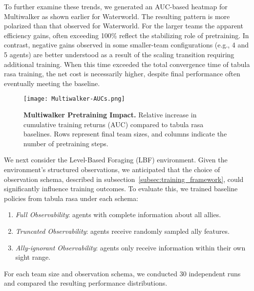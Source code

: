 \documentclass{article}
\begin{document}
To further examine these trends, we generated an AUC-based heatmap for Multiwalker as shown 
earlier for Waterworld. The resulting pattern is more polarized than that observed for Waterworld.
For the larger teams the apparent efficiency gains, often exceeding 100\%
reflect the stabilizing role of pretraining.
In contrast, negative gains observed in some smaller-team configurations (e.g., 4 and 5 agents) 
are better understood as a result of the scaling transition requiring additional training. 
When this time exceeded the total convergence time of tabula rasa training, the net cost 
is necessarily higher, despite final performance often eventually meeting the baseline.

\begin{figure}[!h]
    \centering
    \texttt{[image: Multiwalker-AUCs.png]}
    \caption{\textbf{Multiwalker Pretraining Impact.} 
    Relative increase in cumulative training returns (AUC) compared to tabula rasa baselines. 
    Rows represent final team sizes, and columns indicate the number of pretraining steps.}
    \label{fig:multiwalker-aucs}
\end{figure}

We next consider the Level-Based Foraging (LBF) environment.
Given the environment's structured observations, we anticipated that the
choice of observation schema, described in subsection~\ref{subsec:training_framework},
could significantly influence training outcomes.
To evaluate this, we trained baseline policies from tabula rasa under each schema:
\begin{enumerate}
\item \emph{Full Observability}: agents with complete information about all allies.
\item \emph{Truncated Observability}: agents receive randomly sampled ally features.
\item \emph{Ally-ignorant Observability}: agents only receive information within their own sight range.
\end{enumerate}
For each team size and observation schema, we conducted 30 independent runs
and compared the resulting performance distributions.
\end{document}
